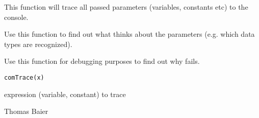 \begin{Description}\relax
This function will trace all passed parameters (variables, constants etc) to
the \R{} console.

Use this function to find out what  thinks about the parameters
(e.g. which data types are recognized).

Use this function for debugging purposes to find out why  fails.
\end{Description}
\begin{Usage}
\begin{verbatim}
comTrace(x)
\end{verbatim}
\end{Usage}
\begin{Arguments}
\begin{ldescription}
\item[\code{x}] expression (variable, constant) to trace
\end{ldescription}
\end{Arguments}
\begin{Author}\relax
Thomas Baier
\end{Author}

